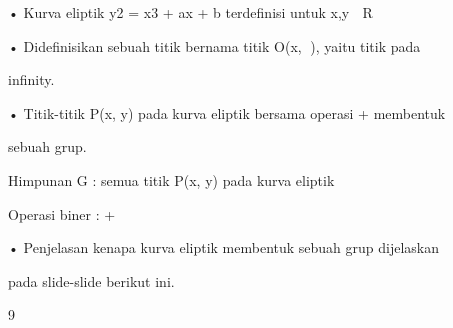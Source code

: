 \documentclass{article}
\begin{document}

• Kurva eliptik y2 = x3 + ax + b terdefinisi untuk x,y  R

• Didefinisikan sebuah titik bernama titik O(x, ), yaitu titik pada 

infinity.

• Titik-titik P(x, y) pada kurva eliptik bersama operasi + membentuk 

sebuah grup.


Himpunan G      : semua titik P(x, y) pada kurva eliptik


Operasi biner   : +

• Penjelasan kenapa kurva eliptik membentuk sebuah grup dijelaskan 

pada slide-slide berikut ini.

9
\end{document}
